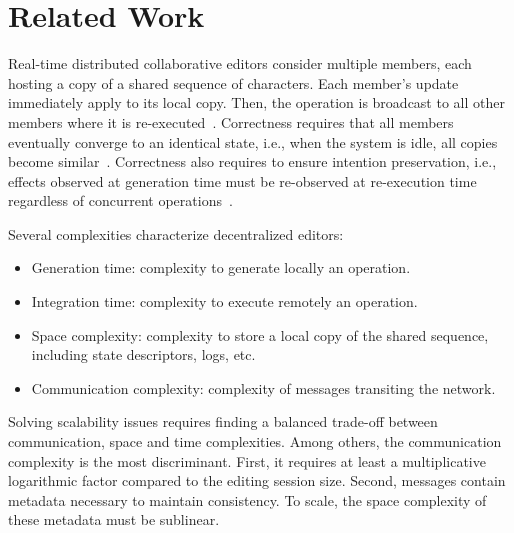 \section{Related Work}
\label{sec:relatedwork}

Real-time distributed collaborative editors consider multiple members, each
hosting a copy of a shared sequence of characters. Each member's update
immediately apply to its local copy. Then, the operation is broadcast to all
other members where it is re-executed~\cite{saito2005optimistic}. Correctness
requires that all members eventually converge to an identical state, i.e., when
the system is idle, all copies become
similar~\cite{bailis2013eventual}. Correctness also requires to ensure intention
preservation, i.e., effects observed at generation time must be re-observed at
re-execution time regardless of concurrent
operations~\cite{sun1998achieving}. 

Several complexities characterize decentralized editors:
\begin{itemize}
\item Generation time: complexity to generate locally an operation.
\item Integration time: complexity to execute remotely an operation.
\item Space complexity: complexity to store a local copy of the shared sequence,
  including state descriptors, logs, etc.
\item Communication complexity: complexity of messages transiting the network.
\end{itemize}
Solving scalability issues requires finding a balanced trade-off between
communication, space and time complexities.  Among others, the communication
complexity is the most discriminant. First, it requires at least a
multiplicative logarithmic factor compared to the editing session size. Second,
messages contain metadata necessary to maintain consistency. To scale, the space
complexity of these metadata must be sublinear.

